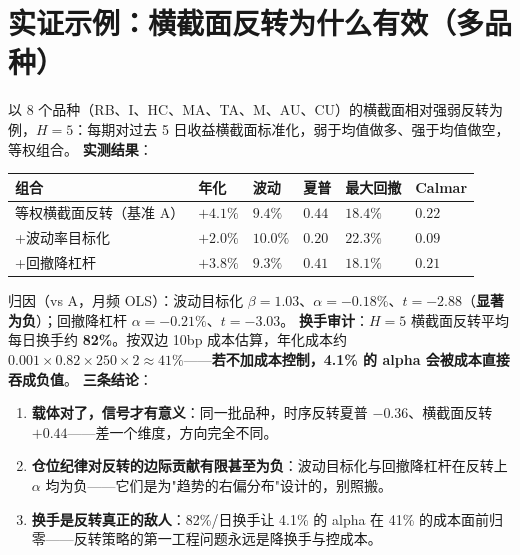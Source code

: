\documentclass[UTF8,11pt]{ctexart}
\begin{document}
\section{实证示例：横截面反转为什么有效（多品种）}
以 8 个品种（RB、I、HC、MA、TA、M、AU、CU）的横截面相对强弱反转为例，$H=5$：每期对过去 5 日收益横截面标准化，弱于均值做多、强于均值做空，等权组合。
\textbf{实测结果}：
\begin{center}
\setlength{\tabcolsep}{4pt}
\renewcommand{\arraystretch}{1.35}
\begin{tabular}{@{}>{\raggedright\arraybackslash}p{4.0cm}>{\raggedright\arraybackslash}p{1.3cm}>{\raggedright\arraybackslash}p{1.3cm}>{\raggedright\arraybackslash}p{1.2cm}>{\raggedright\arraybackslash}p{1.5cm}>{\raggedright\arraybackslash}p{1.3cm}@{}}
\toprule
组合 & 年化 & 波动 & 夏普 & 最大回撤 & Calmar \\
\midrule
等权横截面反转（基准 A） & $+4.1\%$ & $9.4\%$ & \textbf{$0.44$} & $18.4\%$ & $0.22$ \\
+波动率目标化 & $+2.0\%$ & $10.0\%$ & $0.20$ & $22.3\%$ & $0.09$ \\
+回撤降杠杆 & $+3.8\%$ & $9.3\%$ & $0.41$ & $18.1\%$ & $0.21$ \\
\bottomrule
\end{tabular}
\end{center}
归因（vs A，月频 OLS）：波动目标化 $\beta=1.03$、$\alpha=-0.18\%$、$t=-2.88$（\textbf{显著为负}）；回撤降杠杆 $\alpha=-0.21\%$、$t=-3.03$。
\textbf{换手审计}：$H=5$ 横截面反转平均每日换手约 \textbf{82\%}。按双边 10bp 成本估算，年化成本约 $0.001\times0.82\times250\times2\approx41\%$——\textbf{若不加成本控制，4.1\% 的 alpha 会被成本直接吞成负值}。
\textbf{三条结论}：
\begin{enumerate}[itemsep=2pt]
\item \textbf{载体对了，信号才有意义}：同一批品种，时序反转夏普 $-0.36$、横截面反转 $+0.44$——差一个维度，方向完全不同。
\item \textbf{仓位纪律对反转的边际贡献有限甚至为负}：波动目标化与回撤降杠杆在反转上 $\alpha$ 均为负——它们是为"趋势的右偏分布"设计的，别照搬。
\item \textbf{换手是反转真正的敌人}：82\%/日换手让 4.1\% 的 alpha 在 41\% 的成本面前归零——反转策略的第一工程问题永远是降换手与控成本。
\end{enumerate}
\end{document}
